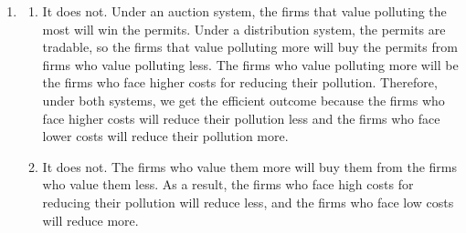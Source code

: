 \documentclass{article}
\begin{document}
\begin{enumerate}
\begin{enumerate}
	\end{enumerate}
	
\item

	\begin{enumerate}
	
	\item It does not. Under an auction system, the firms that value polluting the most will win the permits. Under a distribution system, the permits are tradable, so the firms that value polluting more will buy the permits from firms who value polluting less. The firms who value polluting more will be the firms who face higher costs for reducing their pollution. Therefore, under both systems, we get the efficient outcome because the firms who face higher costs will reduce their pollution less and the firms who face lower costs will reduce their pollution more.
	
	\item It does not. The firms who value them more will buy them from the firms who value them less. As a result, the firms who face high costs for reducing their pollution will reduce less, and the firms who face low costs will reduce more. 
	
	\end{enumerate}

\end{enumerate}
\end{document}
